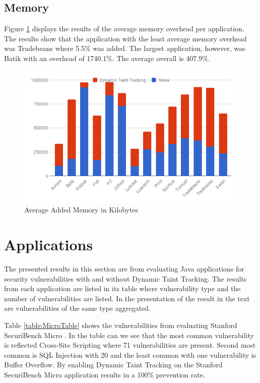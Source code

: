 \subsection{Memory}
Figure \ref{fig:Memory} displays the results of the average memory overhead per application. The results show that the application with the least average memory overhead was Tradebeans where 5.5\% was added. The largest application, however, was Batik with an overhead of 1740.1\%. The average overall is 407.9\%.

\begin{figure}[!hbt]
    \centering
    \includegraphics[width=\textwidth]{images/Memory.png}
    \caption{Average Added Memory in Kilobytes}
    \label{fig:Memory}
\end{figure}



\section{Applications}
\label{Applications}
The presented results in this section are from evaluating Java applications for security vulnerabilities with and without Dynamic Taint Tracking. The results from each application are listed in its table where vulnerability type and the number of vulnerabilities are listed. In the presentation of the result in the text are vulnerabilities of the same type aggregated.

Table \ref{table:MicroTable} shows the vulnerabilities from evaluating Stanford SecuriBench Micro \parencite{securiBenchMicro}. In the table can we see that the most common vulnerability is reflected Cross-Site Scripting where 71 vulnerabilities are present. Second most common is SQL Injection with 20 and the least common with one vulnerability is Buffer Overflow. By enabling Dynamic Taint Tracking on the Stanford SecuriBench Micro \parencite{securiBenchMicro} application results in a 100\% prevention rate.

